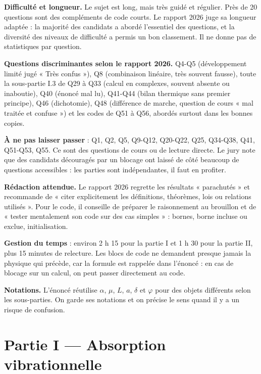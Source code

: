 \documentclass[11pt,a4paper]{article}
\begin{document}
\textbf{Difficulté et longueur.} Le sujet est long, mais très guidé et régulier. Près de 20 questions sont des compléments de code courts. Le rapport 2026 juge sa longueur adaptée : la majorité des candidats a abordé l'essentiel des questions, et la diversité des niveaux de difficulté a permis un bon classement. Il ne donne pas de statistiques par question.

\textbf{Questions discriminantes selon le rapport 2026.} Q4-Q5 (développement limité jugé « Très confus »), Q8 (combinaison linéaire, très souvent fausse), toute la sous-partie I.3 de Q29 à Q33 (calcul en complexes, souvent absente ou inaboutie), Q40 (énoncé mal lu), Q41-Q44 (bilan thermique sans premier principe), Q46 (dichotomie), Q48 (différence de marche, question de cours « mal traitée et confuse ») et les codes de Q51 à Q56, abordés surtout dans les bonnes copies.

\textbf{À ne pas laisser passer} : Q1, Q2, Q5, Q9-Q12, Q20-Q22, Q25, Q34-Q38, Q41, Q51-Q53, Q55. Ce sont des questions de cours ou de lecture directe. Le jury note que des candidats découragés par un blocage ont laissé de côté beaucoup de questions accessibles : les parties sont indépendantes, il faut en profiter.

\textbf{Rédaction attendue.} Le rapport 2026 regrette les résultats « parachutés » et recommande de « citer explicitement les définitions, théorèmes, lois ou relations utilisés ». Pour le code, il conseille de préparer le raisonnement au brouillon et de « tester mentalement son code sur des cas simples » : bornes, borne incluse ou exclue, initialisation.

\textbf{Gestion du temps} : environ 2 h 15 pour la partie I et 1 h 30 pour la partie II, plus 15 minutes de relecture. Les blocs de code ne demandent presque jamais la physique qui précède, car la formule est rappelée dans l'énoncé : en cas de blocage sur un calcul, on peut passer directement au code.

\textbf{Notations.} L'énoncé réutilise \(\alpha\), \(\mu\), \(L\), \(a\), \(\delta\) et \(\varphi\) pour des objets différents selon les sous-parties. On garde ses notations et on précise le sens quand il y a un risque de confusion.

\hypertarget{partie-i-absorption-vibrationnelle}{%
\section{Partie I --- Absorption vibrationnelle}\label{partie-i-absorption-vibrationnelle}}
\end{document}
